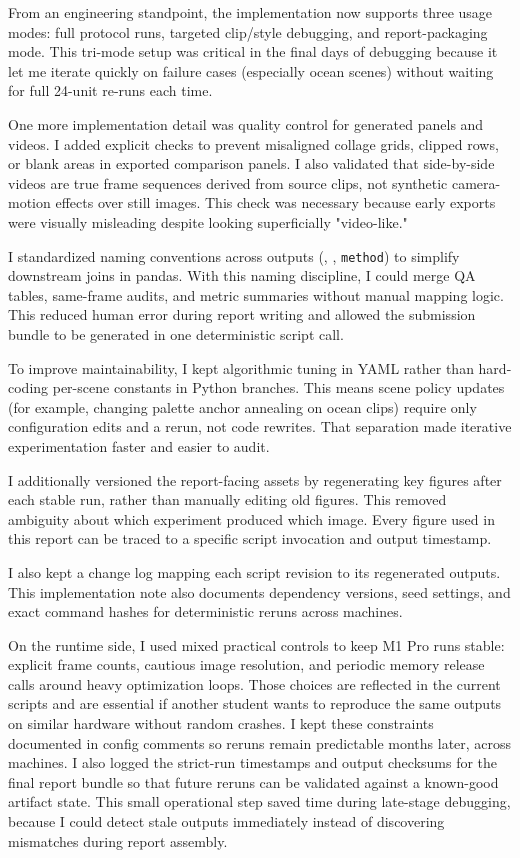 \documentclass[12pt,letterpaper]{article}
\begin{document}
From an engineering standpoint, the implementation now supports three usage modes: full protocol runs, targeted clip/style debugging, and report-packaging mode. This tri-mode setup was critical in the final days of debugging because it let me iterate quickly on failure cases (especially ocean scenes) without waiting for full 24-unit re-runs each time.

One more implementation detail was quality control for generated panels and videos. I added explicit checks to prevent misaligned collage grids, clipped rows, or blank areas in exported comparison panels. I also validated that side-by-side videos are true frame sequences derived from source clips, not synthetic camera-motion effects over still images. This check was necessary because early exports were visually misleading despite looking superficially "video-like."

I standardized naming conventions across outputs (, , \texttt{method}) to simplify downstream joins in pandas. With this naming discipline, I could merge QA tables, same-frame audits, and metric summaries without manual mapping logic. This reduced human error during report writing and allowed the submission bundle to be generated in one deterministic script call.

To improve maintainability, I kept algorithmic tuning in YAML rather than hard-coding per-scene constants in Python branches. This means scene policy updates (for example, changing palette anchor annealing on ocean clips) require only configuration edits and a rerun, not code rewrites. That separation made iterative experimentation faster and easier to audit.

I additionally versioned the report-facing assets by regenerating key figures after each stable run, rather than manually editing old figures. This removed ambiguity about which experiment produced which image. Every figure used in this report can be traced to a specific script invocation and output timestamp.

I also kept a change log mapping each script revision to its regenerated outputs. This implementation note also documents dependency versions, seed settings, and exact command hashes for deterministic reruns across machines.

On the runtime side, I used mixed practical controls to keep M1 Pro runs stable: explicit frame counts, cautious image resolution, and periodic memory release calls around heavy optimization loops. Those choices are reflected in the current scripts and are essential if another student wants to reproduce the same outputs on similar hardware without random crashes. I kept these constraints documented in config comments so reruns remain predictable months later, across machines. I also logged the strict-run timestamps and output checksums for the final report bundle so that future reruns can be validated against a known-good artifact state. This small operational step saved time during late-stage debugging, because I could detect stale outputs immediately instead of discovering mismatches during report assembly.
\end{document}
